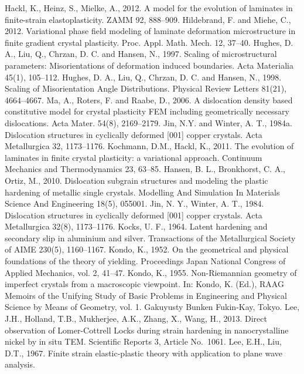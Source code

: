 \documentclass[11pt,reqno]{amsart}
\theoremstyle{plain}
\theoremstyle{definition}
\theoremstyle{remark}
\begin{document}
\begin{thebibliography}{100}
 Hackl, K., Heinz, S., Mielke, A., 2012. A model for the evolution of laminates in finite-strain elastoplasticity. ZAMM 92, 888--909.
 Hildebrand, F. and Miehe, C., 2012. Variational phase field modeling of laminate deformation microstructure in finite gradient crystal plasticity. Proc. Appl. Math. Mech. 12, 37--40.
 Hughes, D. A., Liu, Q., Chrzan, D. C. and Hansen, N., 1997. Scaling of microstructural parameters: Misorientations
of deformation induced boundaries. Acta Materialia 45(1), 105--112.
 Hughes, D. A., Liu, Q., Chrzan, D. C. and Hansen, N., 1998. Scaling of Misorientation Angle Distributions. Physical
Review Letters 81(21), 4664--4667.
 Ma, A., Roters, F. and Raabe, D., 2006. A dislocation density based constitutive model for crystal plasticity FEM including geometrically necessary dislocations. Acta Mater. 54(8), 2169--2179.
 Jin, N.Y. and Winter, A. T., 1984a. Dislocation structures in cyclically deformed [001] copper crystals. Acta Metallurgica 32, 1173--1176.
 Kochmann, D.M., Hackl, K., 2011. The evolution of laminates in finite crystal plasticity: a variational approach. Continuum Mechanics and Thermodynamics 23, 63--85.
Hansen, B. L., Bronkhorst, C. A., Ortiz, M., 2010. Dislocation subgrain structures and modeling the plastic hardening of metallic single crystals. Modelling And Simulation In Materials Science And Engineering 18(5), 055001.
Jin, N. Y., Winter, A. T., 1984. Dislocation structures in cyclically deformed [001] copper crystals. Acta Metallurgica 32(8), 1173--1176.
Kocks, U. F., 1964.  Latent hardening and secondary slip in aluminium and silver. Transactions of the Metallurgical Society of AIME 230(5), 1160--1167.
 Kondo, K., 1952. On the geometrical and physical foundations of the theory of yielding. Proceedings Japan National Congress of Applied Mechanics, vol. 2, 41--47.
 Kondo, K., 1955. Non-Riemannian geometry of imperfect crystals from a macroscopic viewpoint. In: Kondo, K. (Ed.), RAAG Memoirs of the Unifying Study of Basic Problems in Engineering and Physical Science by Means of Geometry, vol. 1. Gakuyusty Bunken Fukin-Kay, Tokyo.
Lee, J.H., Holland, T.B., Mukherjee, A.K., Zhang, X., Wang, H., 2013. Direct observation of Lomer-Cottrell Locks during strain hardening in nanocrystalline nickel by in situ TEM. Scientific Reports 3, Article No.~1061. 
Lee, E.H.,  Liu, D.T., 1967. Finite strain elastic-plastic theory with application to plane wave analysis.

\end{thebibliography}
\end{document}

